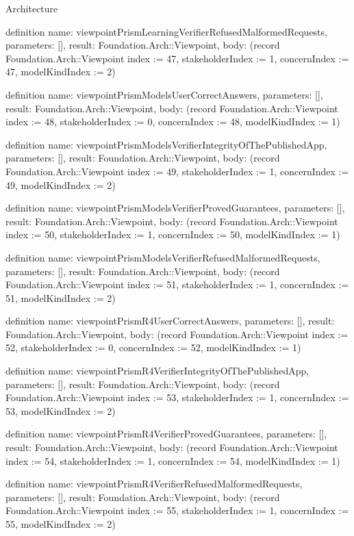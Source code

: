 \begin{lexlean}{Architecture}
\begin{semanticmodule}
definition{
  name: viewpointPrismLearningVerifierRefusedMalformedRequests,
  parameters: [],
  result: Foundation.Arch::Viewpoint,
  body: (record Foundation.Arch::Viewpoint {index := 47, stakeholderIndex := 1, concernIndex := 47, modelKindIndex := 2})
}

definition{
  name: viewpointPrismModelsUserCorrectAnswers,
  parameters: [],
  result: Foundation.Arch::Viewpoint,
  body: (record Foundation.Arch::Viewpoint {index := 48, stakeholderIndex := 0, concernIndex := 48, modelKindIndex := 1})
}

definition{
  name: viewpointPrismModelsVerifierIntegrityOfThePublishedApp,
  parameters: [],
  result: Foundation.Arch::Viewpoint,
  body: (record Foundation.Arch::Viewpoint {index := 49, stakeholderIndex := 1, concernIndex := 49, modelKindIndex := 2})
}

definition{
  name: viewpointPrismModelsVerifierProvedGuarantees,
  parameters: [],
  result: Foundation.Arch::Viewpoint,
  body: (record Foundation.Arch::Viewpoint {index := 50, stakeholderIndex := 1, concernIndex := 50, modelKindIndex := 1})
}

definition{
  name: viewpointPrismModelsVerifierRefusedMalformedRequests,
  parameters: [],
  result: Foundation.Arch::Viewpoint,
  body: (record Foundation.Arch::Viewpoint {index := 51, stakeholderIndex := 1, concernIndex := 51, modelKindIndex := 2})
}

definition{
  name: viewpointPrismR4UserCorrectAnswers,
  parameters: [],
  result: Foundation.Arch::Viewpoint,
  body: (record Foundation.Arch::Viewpoint {index := 52, stakeholderIndex := 0, concernIndex := 52, modelKindIndex := 1})
}

definition{
  name: viewpointPrismR4VerifierIntegrityOfThePublishedApp,
  parameters: [],
  result: Foundation.Arch::Viewpoint,
  body: (record Foundation.Arch::Viewpoint {index := 53, stakeholderIndex := 1, concernIndex := 53, modelKindIndex := 2})
}

definition{
  name: viewpointPrismR4VerifierProvedGuarantees,
  parameters: [],
  result: Foundation.Arch::Viewpoint,
  body: (record Foundation.Arch::Viewpoint {index := 54, stakeholderIndex := 1, concernIndex := 54, modelKindIndex := 1})
}

definition{
  name: viewpointPrismR4VerifierRefusedMalformedRequests,
  parameters: [],
  result: Foundation.Arch::Viewpoint,
  body: (record Foundation.Arch::Viewpoint {index := 55, stakeholderIndex := 1, concernIndex := 55, modelKindIndex := 2})
}


\end{semanticmodule}
\end{lexlean}
